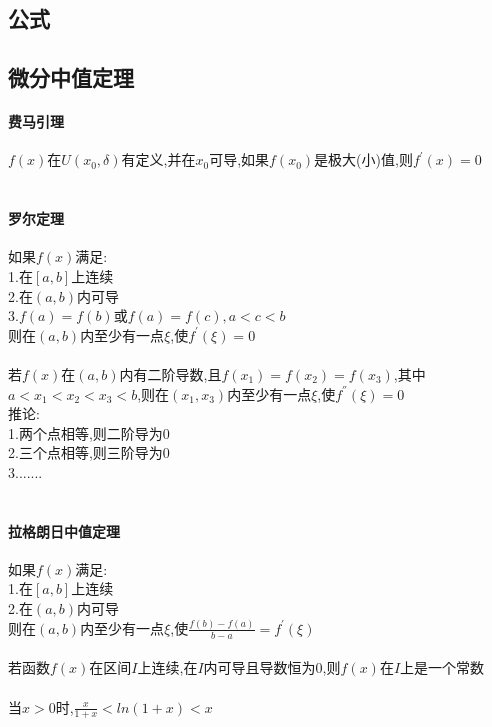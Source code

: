 \documentclass{article}
\begin{document}
\begin{flushleft}
	\huge
	
	\section{公式}
	
	\subsection{微分中值定理}
	
	\paragraph{费马引理}
	$f(x)$在$U(x_0,\delta)$有定义,并在$x_0$可导,如果$f(x_0)$是极大(小)值,则$f^{'}(x)=0$\\
	~\\
	\paragraph{罗尔定理}
	如果$f(x)$满足:\\
	1.在$[a,b]$上连续\\
	2.在$(a,b)$内可导\\
	3.$f(a)=f(b)$或$f(a)=f(c), a<c<b$\\
	则在$(a,b)$内至少有一点$\xi$,使$f^{'}(\xi)=0$\\
	~\\
	若$f(x)$在$(a,b)$内有二阶导数,且$f(x_1)=f(x_2)=f(x_3)$,其中$a<x_1<x_2<x_3<b$,则在$(x_1,x_3)$内至少有一点$\xi$,使$f^{''}(\xi)=0$\\
	推论:\\
	1.两个点相等,则二阶导为0\\
	2.三个点相等,则三阶导为0\\
	3.......\\
	~\\
	\paragraph{拉格朗日中值定理}
	如果$f(x)$满足:\\
	1.在$[a,b]$上连续\\
	2.在$(a,b)$内可导\\
	则在$(a,b)$内至少有一点$\xi$,使$\frac{f(b)-f(a)}{b-a}=f^{'}(\xi)$\\
	~\\
	若函数$f(x)$在区间$I$上连续,在$I$内可导且导数恒为0,则$f(x)$在$I$上是一个常数\\
	~\\
	当$x>0$时,$\frac{x}{1+x}<ln(1+x)<x$\\
	~\\

\end{flushleft}
\end{document}
